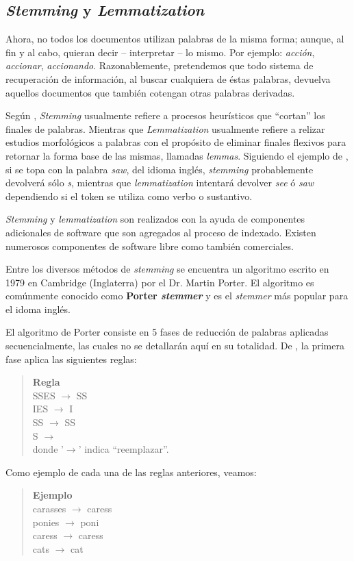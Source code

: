 	\subsection{\textit{Stemming} y \textit{Lemmatization}}
		Ahora, no todos los documentos utilizan palabras de la misma forma; aunque, al fin y al cabo, quieran decir -- interpretar -- lo mismo. Por ejemplo: \textit{acción}, \textit{accionar}, \textit{accionando}. Razonablemente, pretendemos que todo sistema de recuperación de información, al buscar cualquiera de éstas palabras, devuelva aquellos documentos que también cotengan otras palabras derivadas. \par
		
		Según \cite{manning2009}, \textit{Stemming} usualmente refiere a procesos heurísticos que \enquote{cortan} los finales de palabras. Mientras que \textit{Lemmatization} usualmente refiere a relizar estudios morfológicos a palabras con el propósito de eliminar finales flexivos para retornar la forma base de las mismas, llamadas \textit{lemmas}. Siguiendo el ejemplo de \cite{manning2009}, si se topa con la palabra \textit{saw}, del idioma inglés, \textit{stemming} probablemente devolverá sólo \textit{s}, mientras que \textit{lemmatization} intentará devolver \textit{see} ó \textit{saw} dependiendo si el token se utiliza como verbo o sustantivo. \par
		
		\textit{Stemming} y \textit{lemmatization} son realizados con la ayuda de componentes adicionales de software que son agregados al proceso de indexado. Existen numerosos componentes de software libre como también comerciales. \par
		
		Entre los diversos métodos de \textit{stemming} se encuentra un algoritmo escrito en 1979 en Cambridge (Inglaterra) por el Dr. Martin Porter. El algoritmo es comúnmente conocido como \textbf{Porter \textit{stemmer}} y es el \textit{stemmer} más popular para el idoma inglés. \par
		El algoritmo de Porter consiste en 5 fases de reducción de palabras aplicadas secuencialmente, las cuales no se detallarán aquí en su totalidad. De \cite{porterSpammer}, la primera fase aplica las siguientes reglas:
		\begin{quote}
			\textbf{Regla} \\
			SSES $\rightarrow$ SS \\
			IES $\rightarrow$ I \\
			SS $\rightarrow$ SS \\
			S $\rightarrow$  \\
			donde '$\rightarrow$' indica \enquote{reemplazar}.
		\end{quote}
		Como ejemplo de cada una de las reglas anteriores, veamos:
		\begin{quote}
			\textbf{Ejemplo} \\
			carasses $\rightarrow$ caress \\
			ponies $\rightarrow$ poni \\
			caress $\rightarrow$ caress \\
			cats $\rightarrow$ cat \\
		\end{quote}
		
